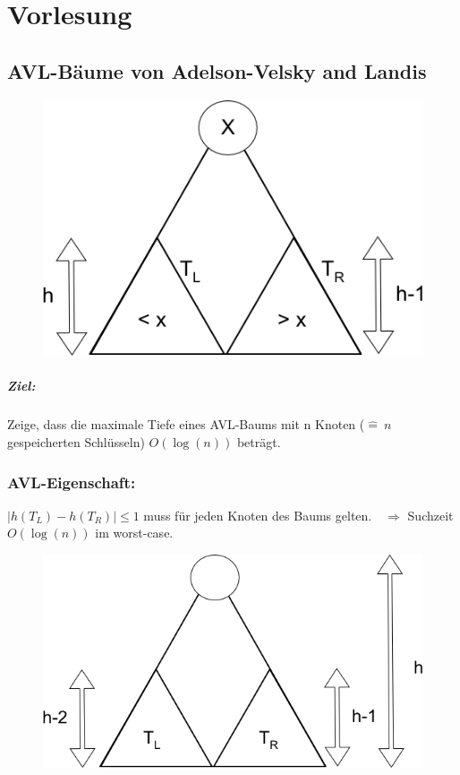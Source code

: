 \chapter{Vorlesung}
\section{AVL-Bäume von Adelson-Velsky and Landis}
\begin{figure}
	\vspace{-50pt}
\includegraphics[width=\linewidth]{11/Grafik/img1.png}
\caption{}
\end{figure}

\vspace{30pt}
\paragraph{Ziel:}%
Zeige, dass die maximale Tiefe eines AVL-Baums mit n Knoten ($\hat{=}~ n$ gespeicherten Schlüsseln) $O(\log(n))$ beträgt.
\vspace{50pt}
\subsection{AVL-Eigenschaft:} 
$|h(T_L)-h(T_R)| \leq 1$ muss für jeden Knoten des Baums gelten. $~~~\Rightarrow$ Suchzeit $O(\log(n))$ im worst-case.\\
\begin{figure}
	\vspace{40pt}
	\includegraphics[width=\linewidth]{11/Grafik/img2.png}
	\caption{}
	\vspace{500pt}
\end{figure}

